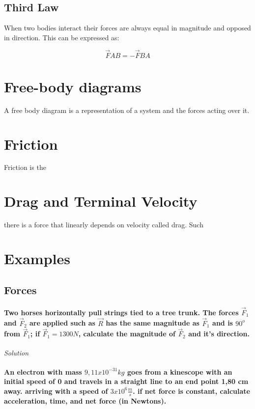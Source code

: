 \documentclass[11pt,fleqn]{book} %
\begin{document}
\subsection{Third Law}

When two bodies interact their forces are always equal in magnitude and
opposed in direction. This can be expressed as:

\begin{equation}
    \vec{F} AB = - \vec{F} BA
\end{equation}

\section{Free-body diagrams}

A free body diagram is a representation of a system and the forces acting over it.

\section{Friction}

Friction is the 

\section{Drag and Terminal Velocity}

there is a force that linearly depends on velocity called drag. Such 


\section{Examples}
\subsection{Forces}

\paragraph{Two horses horizontally pull strings tied
to a tree trunk. The forces $\vec{F}_1$ and $\vec{F}_2$
are applied such as  $\vec{R}$ has the same magnitude as $\vec{F}_1$ 
and is $90^o$ from $\vec{F}_1$; if $\vec{F}_1 = 1300N$, calculate
the magnitude of $\vec{F}_2$ and it's direction.}

\textit{Solution}

\paragraph{An electron with mass $9,11x10^{-31} kg$ goes from
a kinescope with an initial speed of 0 and travels in a straight line to
an end point 1,80 cm away. arriving with a speed of $ 3x10^{6} \frac{m}{s} $.
if net force is constant, calculate acceleration, time, and net force (in Newtons).}
\end{document}
